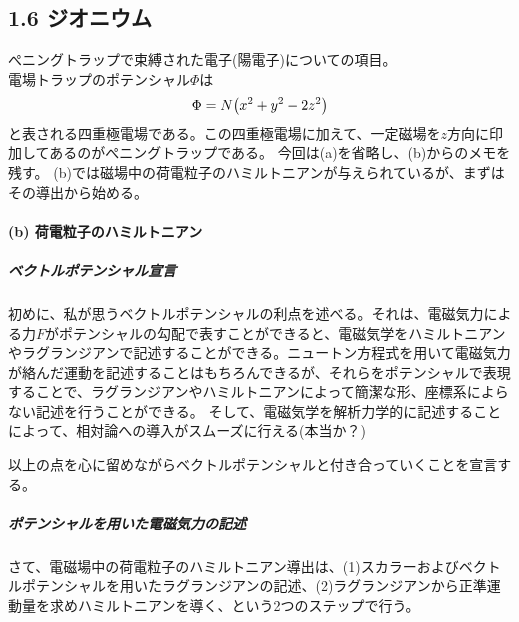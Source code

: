 \documentclass[11pt,a4paper]{jsarticle}
\begin{document}
\subsection*{1.6 ジオニウム}
ぺニングトラップで束縛された電子(陽電子)についての項目。\\
電場トラップのポテンシャル$\Phi$は
\begin{equation}
  \Phi = N \bigl(x^2 + y^2 -2z^2 \bigr)\\
\end{equation}
と表される四重極電場である。この四重極電場に加えて、一定磁場を$z$方向に印加してあるのがぺニングトラップである。
今回は(a)を省略し、(b)からのメモを残す。
(b)では磁場中の荷電粒子のハミルトニアンが与えられているが、まずはその導出から始める。

\paragraph{(b) 荷電粒子のハミルトニアン}
\subparagraph{ベクトルポテンシャル宣言}
初めに、私が思うベクトルポテンシャルの利点を述べる。それは、電磁気力による力$F$がポテンシャルの勾配で表すことができると、電磁気学をハミルトニアンやラグランジアンで記述することができる。ニュートン方程式を用いて電磁気力が絡んだ運動を記述することはもちろんできるが、それらをポテンシャルで表現することで、ラグランジアンやハミルトニアンによって簡潔な形、座標系によらない記述を行うことができる。
そして、電磁気学を解析力学的に記述することによって、相対論への導入がスムーズに行える(本当か？)

以上の点を心に留めながらベクトルポテンシャルと付き合っていくことを宣言する。
\\
\subparagraph{ポテンシャルを用いた電磁気力の記述}
さて、電磁場中の荷電粒子のハミルトニアン導出は、(1)スカラーおよびベクトルポテンシャルを用いたラグランジアンの記述、(2)ラグランジアンから正準運動量を求めハミルトニアンを導く、という2つのステップで行う。
\end{document}
